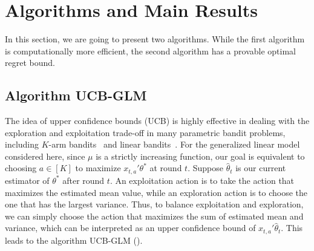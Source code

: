 \section{Algorithms and Main Results} \label{sec:alg}

In this section, we are going to present two algorithms. While the first algorithm is computationally more efficient, the second algorithm has a provable optimal regret bound.

\subsection{Algorithm UCB-GLM} \label{sec:UCB-GLM}

The idea of upper confidence bounds (UCB) is highly effective in dealing with the exploration and exploitation trade-off in many parametric bandit problems, including $K$-arm bandits~\cite{auer2002finite} and linear bandits~\cite{abbasi2011improved,auer2003using,chu2011contextual,dani2008stochastic}. 
For the generalized linear model considered here, since $\mu$ is a strictly increasing function, our goal is equivalent to choosing $a \in [K]$ to maximize $x_{t,a}'\theta^*$ at round $t$. Suppose $\hat{\theta}_t$ is our current estimator of $\theta^*$ after round $t$. An exploitation action is to take the action that maximizes the estimated mean value, while an exploration action is to choose the one that has the largest variance. Thus, to balance exploitation and exploration, we can simply choose the action that maximizes the sum of estimated mean and variance, which can be interpreted as an upper confidence bound of $x_{t,a}'\hat{\theta}_t$.  This leads to the algorithm UCB-GLM ().

